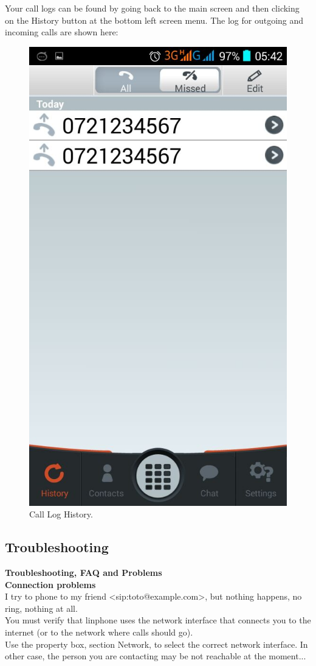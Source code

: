 \documentclass[a4paper]{article}
\begin{document}
Your call logs can be found by going back to the main screen and then clicking on the History button at the bottom left screen menu. The log for outgoing and incoming calls are shown here:

\begin{center}
\begin{figure}[H]
\centering
\includegraphics[width=0.4\linewidth]{pictures/Screenshot_2015-08-04-05-42-53.png}
\caption{\label{fig:Screen9}Call Log History.}
\end{figure}
\end{center}

\newpage
\subsection{Troubleshooting}
\textbf{Troubleshooting, FAQ and Problems} \\

\textbf{Connection problems} \\
I try to phone to my friend <sip:toto@example.com>, but nothing happens, no ring, nothing
at all. \\
You must verify that linphone uses the network interface that connects you to the
internet (or to the network where calls should go). \\
Use the property box, section Network, to select the correct network interface.
In other case, the person you are contacting may be not reachable at the moment... \\
\end{document}
